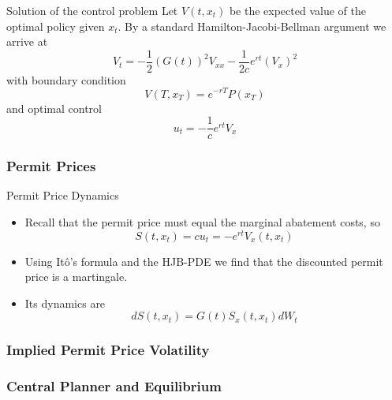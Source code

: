 {Solution of the control problem}
Let $V(t,x_t)$ be the expected value of the optimal policy given $x_t$. By a standard
Hamilton-Jacobi-Bellman argument we arrive at
\begin{equation}
V_t=-\frac{1}{2}(G(t))^2 V_{xx}-\frac{1}{2c}e^{rt}(V_x)^2
\end{equation}
with boundary condition
$$
V(T, x_T)=e^{-rT}P(x_T)
$$
and optimal control
$$
u_t=-\frac{1}{c} e^{rt}V_x
$$

\begin{frame}
  \frametitle{Permit Prices}
\begin{center}
\begin{figure}[h!]
\centering
{}

\end{figure}
\end{center}
\end{frame}


{Permit Price Dynamics}
\begin{itemize}
\item<1-> Recall that the permit price must equal the marginal abatement costs, so
\begin{equation}
S(t,x_t) = c u_t = -e^{rt} V_x(t,x_t)
\end{equation}
\item<2-> Using It{\^o}'s formula and the HJB-PDE we find that the discounted permit price is a martingale.
\item<3-> Its dynamics are
\begin{equation}
dS(t,x_t)= G(t)S_x(t,x_t) dW_t
\end{equation}
\end{itemize}


\begin{frame}
  \frametitle{Implied Permit Price Volatility}
\begin{center}
\begin{figure}[h!]
\centering
{}

\end{figure}
\end{center}
\end{frame}

\subsubsection{Central Planner and Equilibrium}

